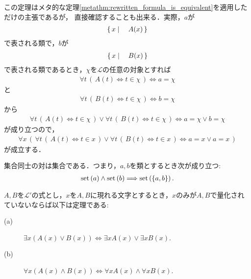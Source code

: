 	この定理はメタ的な定理\ref{metathm:rewritten_formula_is_equivalent}を適用しただけの主張であるが，
	直接確認することも出来る．実際，$a$が
	\begin{align}
		\left\{\, x \mid \quad A(x)\, \right\}
	\end{align}
	で表される類で，$b$が
	\begin{align}
		\left\{\, x \mid \quad B(x)\, \right\}
	\end{align}
	で表される類であるとき，$\chi$を$\mathcal{L}$の任意の対象とすれば
	\begin{align}
		\forall t\, (\, A(t) \Longleftrightarrow t \in \chi\, ) \Longleftrightarrow a = \chi
	\end{align}
	と
	\begin{align}
		\forall t\, (\, B(t) \Longleftrightarrow t \in \chi\, ) \Longleftrightarrow b = \chi
	\end{align}
	から
	\begin{align}
		\forall t\, (\, A(t) \Longleftrightarrow t \in \chi\, ) \vee
		\forall t\, (\, B(t) \Longleftrightarrow t \in \chi\, )
		\Longleftrightarrow
		a = \chi \vee b = \chi
	\end{align}
	が成り立つので，
	\begin{align}
		\forall x\, \left(\, \forall t\, (\, A(t) \Longleftrightarrow t \in x\, ) \vee
		\forall t\, (\, B(t) \Longleftrightarrow t \in x\, )
		\Longleftrightarrow
		a = x \vee a = x\, \right)
	\end{align}
	が成立する．
	
	\begin{screen}
		\begin{axm}[対の公理]
			集合同士の対は集合である．つまり，$a,b$を類とするとき次が成り立つ:
			\begin{align}
				\operatorname*{set} \left(a\right) \wedge \operatorname*{set} \left(b\right) \Longrightarrow 
				\operatorname*{set} \left(\{a,b\}\right).
			\end{align}
		\end{axm}
	\end{screen}
	
	\begin{screen}
		\begin{logicalthm}[量化記号の性質(ロ)]\label{logicalthm:properties_of_quantifiers_2}
			$A,B$を$\mathcal{L}'$の式とし，$x$を$A,B$に現れる文字とするとき，$x$のみが$A,B$で量化されていないならば以下は定理である:
			\begin{description}
				\item[(a)] $\exists x ( A(x) \vee B(x) ) \Longleftrightarrow \exists x A(x) \vee \exists x B(x)$.
				
				\item[(b)] $\forall x ( A(x) \wedge B(x) ) \Longleftrightarrow \forall x A(x) \wedge \forall x B(x)$.
			\end{description}
		\end{logicalthm}
	\end{screen}
	
